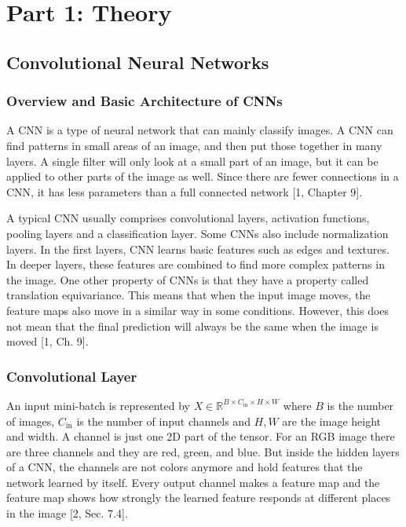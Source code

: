 \begingroup
\renewcommand{\thesubsection}{\arabic{subsection}}
\renewcommand{\thesubsubsection}{\thesubsection.\arabic{subsubsection}}
\setcounter{subsection}{0}
\setcounter{secnumdepth}{3}
\section*{Part 1: Theory}

\subsection{Convolutional Neural Networks}\label{theory:2.2}

\subsubsection{Overview and Basic Architecture of CNNs}\label{theory:2.2.1}

A CNN is a type of neural network that can mainly classify images. A CNN can find patterns in small areas of an image, and then put those together in many layers. A single filter will only look at a small part of an image, but it can be applied to other parts of the image as well. Since there are fewer connections in a CNN, it has less parameters than a full connected network [1, Chapter 9].

A typical CNN usually comprises convolutional layers, activation functions, pooling layers and a classification layer. Some CNNs also include normalization layers. In the first layers, CNN learns basic features such as edges and textures. In deeper layers, these features are combined to find more complex patterns in the image. One other property of CNNs is that they have a property called translation equivariance. This means that when the input image moves, the feature maps also move in a similar way in some conditions. However, this does not mean that the final prediction will always be the same when the image is moved [1, Ch. 9].

\subsubsection{Convolutional Layer}\label{theory:2.2.2}

An input mini-batch is represented by \(X\in {\mathbb{R}}^{B\times {C}_{\mathrm{in}}\times H\times W}\) where \(B\) is the number of images, \({C}_{\mathrm{in}}\) is the number of input channels and \(H,W\) are the image height and width. A channel is just one 2D part of the tensor. For an RGB image there are three channels and they are red, green, and blue. But inside the hidden layers of a CNN, the channels are not colors anymore and hold features that the network learned by itself. Every output channel makes a feature map and the feature map shows how strongly the learned feature responds at different places in the image [2, Sec. 7.4].

